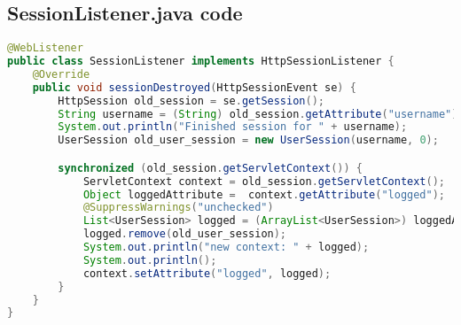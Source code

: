 \subsection{SessionListener.java code}
\begin{lstlisting}[language=java, caption={listener of session changes}]
@WebListener
public class SessionListener implements HttpSessionListener {
    @Override
    public void sessionDestroyed(HttpSessionEvent se) {
        HttpSession old_session = se.getSession();
        String username = (String) old_session.getAttribute("username");
        System.out.println("Finished session for " + username);
        UserSession old_user_session = new UserSession(username, 0);

        synchronized (old_session.getServletContext()) {
            ServletContext context = old_session.getServletContext();
            Object loggedAttribute =  context.getAttribute("logged");
            @SuppressWarnings("unchecked")
            List<UserSession> logged = (ArrayList<UserSession>) loggedAttribute;
            logged.remove(old_user_session);
            System.out.println("new context: " + logged);
            System.out.println();
            context.setAttribute("logged", logged);
        }
    }
}
\end{lstlisting}